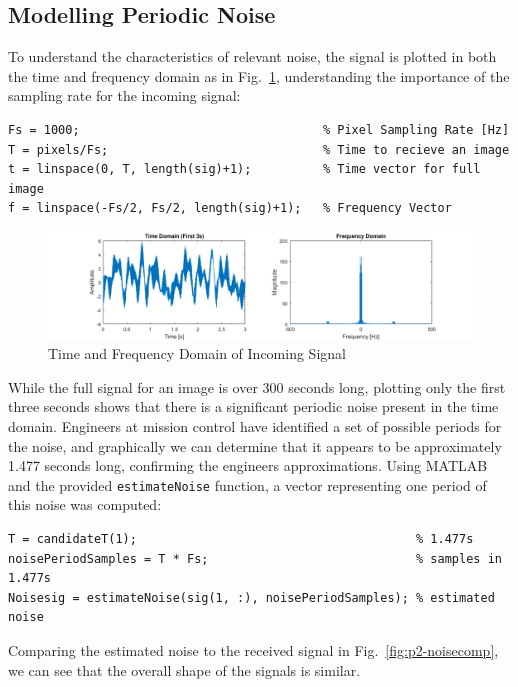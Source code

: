 \documentclass[12pt]{article}
\begin{document}
\subsection{Modelling Periodic Noise}

To understand the characteristics of relevant noise, the signal is plotted in
both the time and frequency domain as in Fig.~\ref{fig:p2-timefreq},
understanding the importance of the sampling rate for the incoming signal:
\begin{verbatim}
Fs = 1000;                                  % Pixel Sampling Rate [Hz]
T = pixels/Fs;                              % Time to recieve an image
t = linspace(0, T, length(sig)+1);          % Time vector for full image
f = linspace(-Fs/2, Fs/2, length(sig)+1);   % Frequency Vector
\end{verbatim}

\begin{figure}[h]
    \centering
    \includegraphics{figures/p2-timefreq.png}
    \caption{Time and Frequency Domain of Incoming Signal\label{fig:p2-timefreq}}
\end{figure}

While the full signal for an image is over 300 seconds long, plotting only the
first three seconds shows that there is a significant periodic noise present in
the time domain. Engineers at mission control have identified a set of possible
periods for the noise, and graphically we can determine that it appears to be
approximately 1.477 seconds long, confirming the engineers approximations.
Using MATLAB and the provided \verb+estimateNoise+ function, a vector
representing one period of this noise was computed:
\begin{verbatim}
T = candidateT(1);                                       % 1.477s 
noisePeriodSamples = T * Fs;                             % samples in 1.477s 
Noisesig = estimateNoise(sig(1, :), noisePeriodSamples); % estimated noise 
\end{verbatim}

Comparing the estimated noise to the received signal in
Fig.~\ref{fig:p2-noisecomp}, we can see that the overall shape of the signals
is similar.
\end{document}
